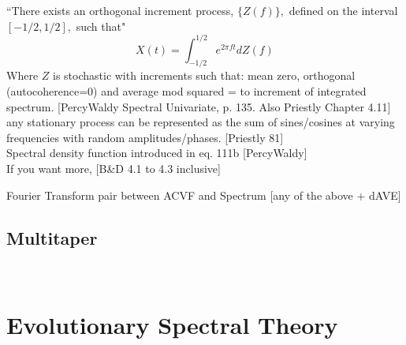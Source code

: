\documentclass{article}
\begin{document}
``There exists an orthogonal increment process,
$\{Z(f)\},$ defined on the interval $[-1/2, 1/2],$ such that" 
\begin{equation}
    X(t) = \int_{-1/2}^{1/2} e^{2\pi ft}dZ(f)
\end{equation}
Where $Z$ is stochastic with increments such that: mean zero, orthogonal (autocoherence=0) and average mod squared = to increment of integrated spectrum. [PercyWaldy Spectral Univariate, p. 135. Also Priestly Chapter 4.11] \\

any stationary process can be represented as the sum of sines/cosines at varying frequencies with random amplitudes/phases. [Priestly 81] \\

Spectral density function introduced in eq. 111b [PercyWaldy] \\

If you want more, [B\&D 4.1 to 4.3 inclusive]

Fourier Transform pair between ACVF and Spectrum [any of the above + dAVE]


\subsection{Multitaper}
    \\[8pt]


\section{Evolutionary Spectral Theory}
\end{document}
